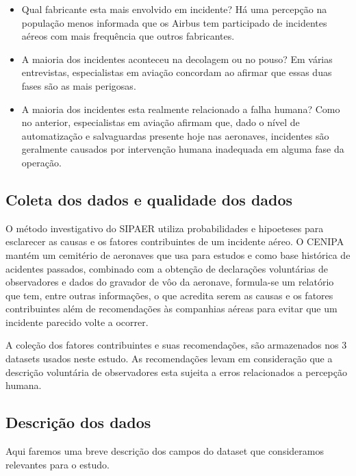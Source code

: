 \documentclass[conference]{IEEEtran}
\begin{document}
\begin{itemize}
 \item Qual fabricante esta mais envolvido em incidente? Há uma percepção na população menos informada que os Airbus tem participado de incidentes aéreos com mais frequência
 que outros fabricantes.
 \item A maioria dos incidentes aconteceu na decolagem ou no pouso? Em várias entrevistas, especialistas em aviação concordam ao afirmar que essas duas fases são as
 mais perigosas.
 \item A maioria dos incidentes esta realmente relacionado a falha humana? Como no anterior, especialistas em aviação afirmam que, dado o nível de automatização e salvaguardas 
 presente hoje nas aeronaves, incidentes são geralmente causados por intervenção humana inadequada em alguma fase da operação.
\end{itemize}


\subsection{Coleta dos dados e qualidade dos dados}

O método investigativo do SIPAER utiliza probabilidades e hipoeteses para esclarecer as causas e os fatores contribuintes de um incidente aéreo. O CENIPA mantém um 
cemitério de aeronaves que usa para estudos e como base histórica de acidentes passados, combinado com a obtenção de declarações voluntárias de observadores e dados do 
gravador de vôo da aeronave, formula-se um relatório que tem, entre outras informações, o que acredita serem as causas e os fatores contribuintes além de recomendações
às companhias aéreas para evitar que um incidente parecido volte a ocorrer.

A coleção dos fatores contribuintes e suas recomendações, são armazenados nos 3 datasets usados neste estudo. As recomendações levam em consideração que a descrição voluntária
de observadores esta sujeita a erros relacionados a percepção humana.

\subsection{Descrição dos dados}

Aqui faremos uma breve descrição dos campos do dataset que consideramos relevantes para o estudo.
\end{document}
